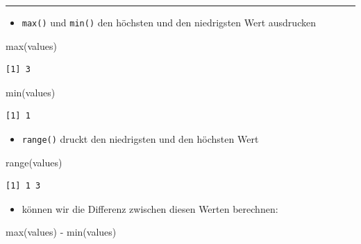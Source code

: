 \documentclass[
  letterpaper,
  DIV=11]{scrartcl}
\newenvironment{Shaded}{\begin{snugshade}}{\end{snugshade}}
\newcommand{\FunctionTok}[1]{\textcolor[rgb]{0.28,0.35,0.67}{#1}}
\newcommand{\NormalTok}[1]{\textcolor[rgb]{0.00,0.23,0.31}{#1}}
\newcommand{\SpecialCharTok}[1]{\textcolor[rgb]{0.37,0.37,0.37}{#1}}
\providecommand{\tightlist}{%
  \setlength{\itemsep}{0pt}\setlength{\parskip}{0pt}}\usepackage{longtable,booktabs,array}
\begin{document}
\begin{center}\rule{0.5\linewidth}{0.5pt}\end{center}

\begin{itemize}
\tightlist
\item
  \texttt{max()} und \texttt{min()} den höchsten und den niedrigsten
  Wert ausdrucken
\end{itemize}

\begin{Shaded}
\begin{Highlighting}[]
\FunctionTok{max}\NormalTok{(values)}
\end{Highlighting}
\end{Shaded}

\begin{verbatim}
[1] 3
\end{verbatim}

\begin{Shaded}
\begin{Highlighting}[]
\FunctionTok{min}\NormalTok{(values)}
\end{Highlighting}
\end{Shaded}

\begin{verbatim}
[1] 1
\end{verbatim}

\begin{itemize}
\tightlist
\item
  \texttt{range()} druckt den niedrigsten und den höchsten Wert
\end{itemize}

\begin{Shaded}
\begin{Highlighting}[]
\FunctionTok{range}\NormalTok{(values)}
\end{Highlighting}
\end{Shaded}

\begin{verbatim}
[1] 1 3
\end{verbatim}

\begin{itemize}
\tightlist
\item
  können wir die Differenz zwischen diesen Werten berechnen:
\end{itemize}

\begin{Shaded}
\begin{Highlighting}[]
\FunctionTok{max}\NormalTok{(values) }\SpecialCharTok{{-}} \FunctionTok{min}\NormalTok{(values)}
\end{Highlighting}
\end{Shaded}
\end{document}
